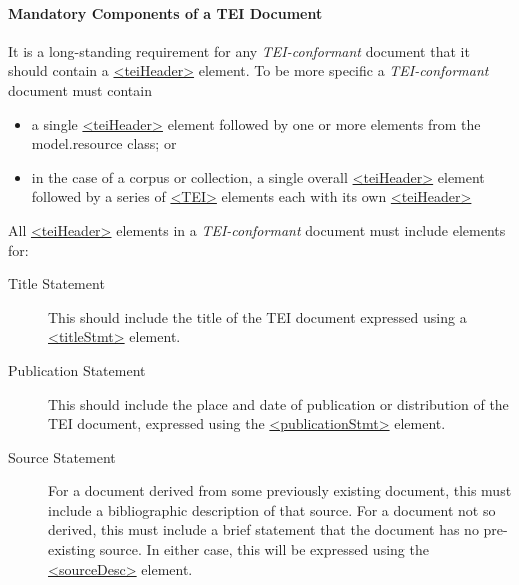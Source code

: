 \paragraph[{Mandatory Components of a TEI Document}]{Mandatory Components of a TEI Document}\label{CFAMmc}\par
It is a long-standing requirement for any \textit{TEI-conformant} document that it should contain a \hyperref[TEI.teiHeader]{<teiHeader>} element. To be more specific a \textit{TEI-conformant} document must contain \begin{itemize}
\item a single \hyperref[TEI.teiHeader]{<teiHeader>} element followed by one or more elements from the \textsf{model.resource} class; or
\item in the case of a corpus or collection, a single overall \hyperref[TEI.teiHeader]{<teiHeader>} element followed by a series of \hyperref[TEI.TEI]{<TEI>} elements each with its own \hyperref[TEI.teiHeader]{<teiHeader>}
\end{itemize}  All \hyperref[TEI.teiHeader]{<teiHeader>} elements in a \textit{TEI-conformant} document must include elements for: \begin{description}

\item[{Title Statement}]This should include the title of the TEI document expressed using a \hyperref[TEI.titleStmt]{<titleStmt>} element.
\item[{Publication Statement}]This should include the place and date of publication or distribution of the TEI document, expressed using the \hyperref[TEI.publicationStmt]{<publicationStmt>} element.
\item[{Source Statement}]For a document derived from some previously existing document, this must include a bibliographic description of that source. For a document not so derived, this must include a brief statement that the document has no pre-existing source. In either case, this will be expressed using the \hyperref[TEI.sourceDesc]{<sourceDesc>} element.
\end{description} 

